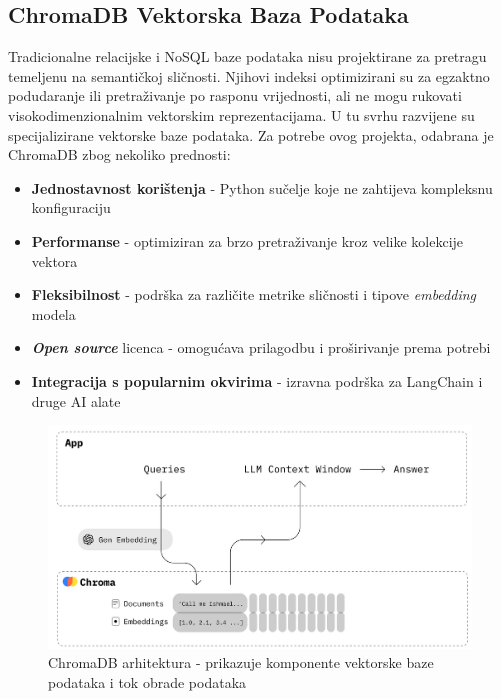 \subsection{ChromaDB Vektorska Baza Podataka}

Tradicionalne relacijske i NoSQL baze podataka nisu projektirane za pretragu temeljenu na semantičkoj sličnosti. Njihovi indeksi optimizirani su za egzaktno podudaranje ili pretraživanje po rasponu vrijednosti, ali ne mogu rukovati visokodimenzionalnim vektorskim reprezentacijama. U tu svrhu razvijene su specijalizirane vektorske baze podataka. Za potrebe ovog projekta, odabrana je ChromaDB zbog nekoliko prednosti:

\begin{itemize}
    \item \textbf{Jednostavnost korištenja} - Python sučelje koje ne zahtijeva kompleksnu konfiguraciju
    \item \textbf{Performanse} - optimiziran za brzo pretraživanje kroz velike kolekcije vektora
    \item \textbf{Fleksibilnost} - podrška za različite metrike sličnosti i tipove \textit{embedding} modela
    \item \textbf{\textit{Open source}} licenca - omogućava prilagodbu i proširivanje prema potrebi
    \item \textbf{Integracija s popularnim okvirima} - izravna podrška za LangChain i druge AI alate
\end{itemize}

\begin{figure}[h!]
    \centering
    \includegraphics[width=1\textwidth]{figures/chroma.png}
    \caption{ChromaDB arhitektura - prikazuje komponente vektorske baze podataka i tok obrade podataka}
    \label{fig:chromadb_architecture}
\end{figure}

